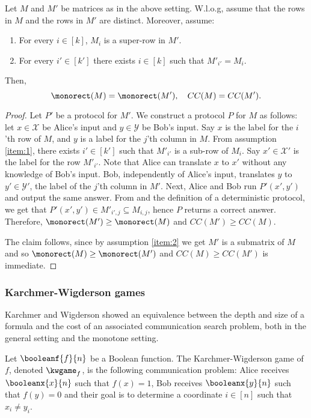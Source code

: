\documentclass[acmsmall, nonacm, authorversion]{acmart}
\begin{document}
\begin{lemma}\label{lem:simplification-lemma}
Let $M$ and $M'$ be matrices as in the above setting. W.l.o.g, assume that the rows in $M$ and the rows in $M'$ are distinct. Moreover, assume:
\begin{enumerate}
    \item For every $i\in[k]$, $M_i$ is a super-row in $M'$. \label{item:1}
    \item For every $i'\in [k']$ there exists $i\in [k]$ such that $M'_{i'}=M_{i}$. \label{item:2}
\end{enumerate}
Then, 
\[
\monorect(M)=\monorect(M'), \quad CC(M)=CC(M').
\]
\end{lemma}
\begin{proof}
Let $P'$ be a protocol for $M'$. We construct a protocol $P$ for $M$ as follows: let $x\in \mathcal{X}$ be Alice's input and $y\in \mathcal{Y}$ be Bob's input. Say $x$ is the label for the $i$'th row of $M$, and $y$ is a label for the $j$'th column in $M$. From assumption \ref{item:1}, there exists $i'\in[k']$ such that $M'_{i'}$ is a sub-row of $M_{i}$. Say $x' \in \mathcal{X}'$ is the label for the row $M'_{i'}$. Note that Alice can translate $x$ to $x'$ without any knowledge of Bob's input. Bob, independently of Alice's input, translates $y$ to $y'\in \mathcal{Y}'$, the label of the $j$'th column in $M'$. Next, Alice and Bob run $P'(x',y')$ and output the same answer. From  and the definition of a deterministic protocol, we get that $P'(x',y')\in M'_{i',j}\subseteq M_{i,j}$, hence $P$ returns a correct answer. Therefore, $\monorect(M')\ge \monorect(M)$ and $CC(M')\ge CC(M)$.

The claim follows, since by assumption \ref{item:2} we get $M'$ is a submatrix of $M$ and so $\monorect(M)\ge \monorect(M')$ and $CC(M)\ge CC(M')$ is immediate.
\end{proof}

\subsubsection{Karchmer-Wigderson games}\label{subsec:kw-games}
Karchmer and Wigderson \cite{KW90} showed an equivalence between the depth and size of a formula and the cost of an associated communication search problem, both in the general setting and the monotone setting.

\begin{definition}\label{def:classic-kw-game}
Let $\booleanf{f}{n}$ be a Boolean function. The Karchmer-Wigderson game of $f$, denoted $\kwgame_{f}$, is the following communication problem: Alice receives $\booleanx{x}{n}$ such that $f(x)=1$, Bob receives $\booleanx{y}{n}$ such that $f(y)=0$ and their goal is to determine a coordinate $i\in[n]$ such that $x_{i} \neq y_{i}$.
\end{definition}
\end{document}
